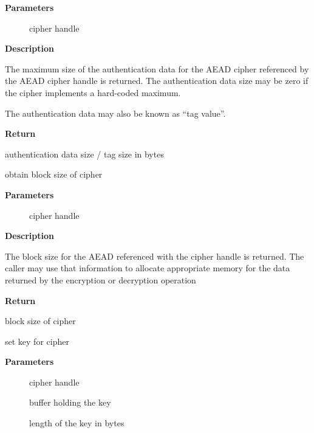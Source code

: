 \documentclass[a4paper,8pt,english]{sphinxmanual}
\begin{document}
\textbf{Parameters}
\begin{description}
\item[{}] \leavevmode
cipher handle

\end{description}

\textbf{Description}

The maximum size of the authentication data for the AEAD cipher referenced
by the AEAD cipher handle is returned. The authentication data size may be
zero if the cipher implements a hard-coded maximum.

The authentication data may also be known as ``tag value''.

\textbf{Return}

authentication data size / tag size in bytes

\begin{fulllineitems}
\label{crypto/api-aead:c.crypto_aead_blocksize}
obtain block size of cipher

\end{fulllineitems}


\textbf{Parameters}
\begin{description}
\item[{}] \leavevmode
cipher handle

\end{description}

\textbf{Description}

The block size for the AEAD referenced with the cipher handle is returned.
The caller may use that information to allocate appropriate memory for the
data returned by the encryption or decryption operation

\textbf{Return}

block size of cipher

\begin{fulllineitems}
\label{crypto/api-aead:c.crypto_aead_setkey}
set key for cipher

\end{fulllineitems}


\textbf{Parameters}
\begin{description}
\item[{}] \leavevmode
cipher handle

\item[{}] \leavevmode
buffer holding the key

\item[{}] \leavevmode
length of the key in bytes

\end{description}
\end{document}
